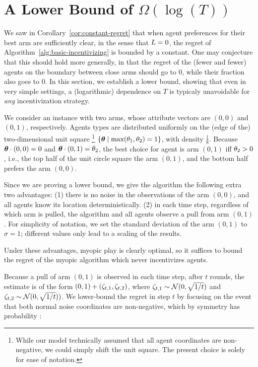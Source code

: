 \section{A Lower Bound of $\Omega(\log(T))$} \label{sec:lb}

We saw in Corollary~\ref{cor:constant-regret} that
when agent preferences for their best arm are sufficiently clear,
in the sense that $L = 0$, the regret of
Algorithm~\ref{alg:basic-incentivizing} is bounded by a constant.
One may conjecture that this should hold more generally,
in that the regret of the (fewer and fewer) agents on the boundary
between close arms should go to 0, while their fraction also goes to 0.
In this section, we establish a lower bound,
showing that even in very simple settings, a (logarithmic) dependence
on $T$ is typicaly unavoidable for \emph{any} incentivization strategy.

We consider an instance with two arms,
whose attribute vectors are $(0,0)$ and $(0,1)$, respectively.
Agents types are distributed uniformly on the (edge of the)
two-dimensional unit square%
\footnote{While our model technically assumed that all agent coordinates are
non-negative, we could simply shift the unit square.
The present choice is solely for ease of notation.}  
$\{ \bm{\theta} \mid \max(\theta_{1}, \theta_{2}) = 1 \}$,
with density $\frac{1}{8}$.
Because $\bm{\theta} \cdot (0,0) = 0$ and $\bm{\theta} \cdot (0,1) = \theta_{2}$,
the best choice for agent \AgV is arm $(0,1)$ iff $\theta_{2} > 0$,
i.e., the top half of the unit circle square the arm $(0,1)$,
and the bottom half prefers the arm $(0,0)$.

Since we are proving a lower bound, we give the algorithm the
following extra two advantages:
(1) there is no noise in the observations of the arm $(0,0)$,
and all agents know its location deterministically.
(2) in each time step, regardless of which arm is pulled, the algorithm
and all agents observe a pull from arm $(0,1)$.
For simplicity of notation, we set the standard deviation of the arm
$(0,1)$ to $\sigma = 1$;
different values only lead to a scaling of the results.

Under these advantages, myopic play is clearly optimal, so it suffices
to bound the regret of the myopic algorithm which never incentivizes
agents. 

Because a pull of arm $(0,1)$ is observed in each time step,
after $t$ rounds, the estimate  is of the form
$(0,1) + (\Noise[t]{1}, \Noise[t]{2})$,
where $\Noise[t]{1} \sim \Normal{0}{\sqrt{1/t}}$
and $\Noise[t]{2} \sim \Normal{0}{\sqrt{1/t}})$.
We lower-bound the regret in step $t$ by focusing on the event that
both normal noise coordinates are non-negative,
which by symmetry has probability \quarter:

